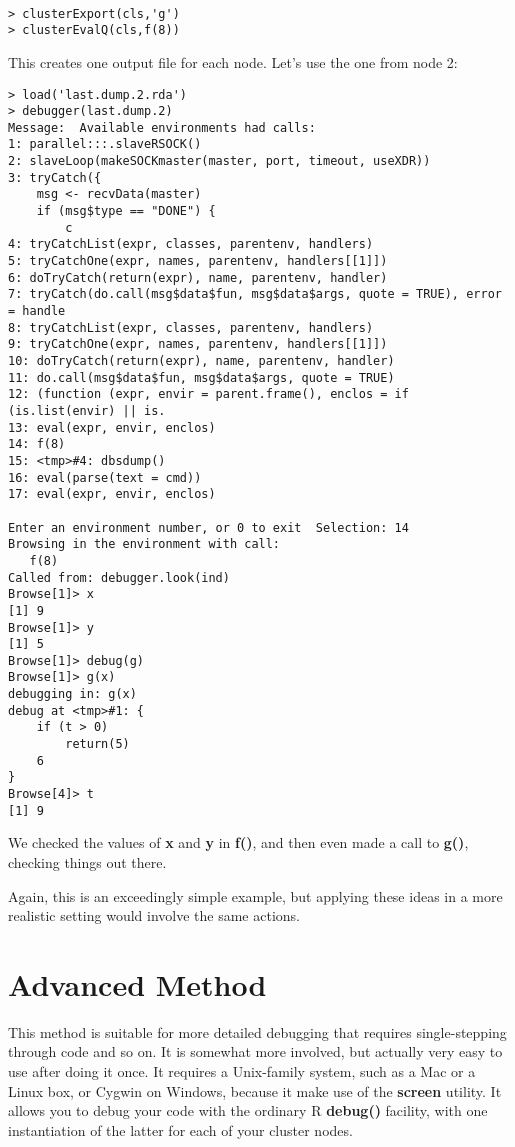 \documentclass[11pt]{article}\usepackage[]{graphicx}\usepackage[]{color}
\begin{document}
\begin{verbatim}







> clusterExport(cls,'g')
> clusterEvalQ(cls,f(8))
\end{verbatim}

This creates one output file for each node.  Let's use the one from node
2:

\begin{verbatim}
> load('last.dump.2.rda')
> debugger(last.dump.2)
Message:  Available environments had calls:
1: parallel:::.slaveRSOCK()
2: slaveLoop(makeSOCKmaster(master, port, timeout, useXDR))
3: tryCatch({
    msg <- recvData(master)
    if (msg$type == "DONE") {
        c
4: tryCatchList(expr, classes, parentenv, handlers)
5: tryCatchOne(expr, names, parentenv, handlers[[1]])
6: doTryCatch(return(expr), name, parentenv, handler)
7: tryCatch(do.call(msg$data$fun, msg$data$args, quote = TRUE), error = handle
8: tryCatchList(expr, classes, parentenv, handlers)
9: tryCatchOne(expr, names, parentenv, handlers[[1]])
10: doTryCatch(return(expr), name, parentenv, handler)
11: do.call(msg$data$fun, msg$data$args, quote = TRUE)
12: (function (expr, envir = parent.frame(), enclos = if (is.list(envir) || is.
13: eval(expr, envir, enclos)
14: f(8)
15: <tmp>#4: dbsdump()
16: eval(parse(text = cmd))
17: eval(expr, envir, enclos)

Enter an environment number, or 0 to exit  Selection: 14
Browsing in the environment with call:
   f(8)
Called from: debugger.look(ind)
Browse[1]> x
[1] 9
Browse[1]> y
[1] 5
Browse[1]> debug(g)
Browse[1]> g(x)
debugging in: g(x)
debug at <tmp>#1: {
    if (t > 0) 
        return(5)
    6
}
Browse[4]> t
[1] 9
\end{verbatim}

We checked the values of {\bf x} and {\bf y} in {\bf f()}, and then even
made a call to {\bf g()}, checking things out there.

Again, this is an exceedingly simple example, but applying these ideas
in a more realistic setting would involve the same actions.

\section{Advanced Method}

This method is suitable for more detailed debugging that requires
single-stepping through code and so on. It is somewhat more involved,
but actually very easy to use after doing it once.  It requires a
Unix-family system, such as a Mac or a Linux box, or Cygwin on Windows,
because it make use of the {\bf screen} utility.  It allows you to debug
your code with the ordinary R {\bf debug()} facility, with one
instantiation of the latter for each of your cluster nodes.
\end{document}
